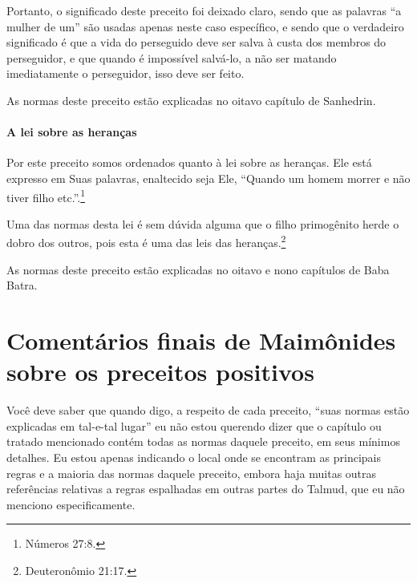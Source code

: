 Portanto, o significado deste preceito foi deixado claro, sendo que as
palavras ``a mulher de um'' são usadas apenas neste caso específico, e
sendo que o verdadeiro significado é que a vida do perseguido deve ser
salva à custa dos membros do perseguidor, e que quando é impossível salvá-lo, a não
ser matando imediatamente o perseguidor, isso deve ser feito.

As normas deste preceito estão explicadas no oitavo capítulo de Sanhedrin.

\paragraph{A lei sobre as heranças}

Por este preceito somos ordenados quanto à lei sobre as heranças. Ele
está expresso em Suas palavras, enaltecido seja Ele, ``Quando um homem
morrer e não tiver filho etc.''.\footnote{Números 27:8.}

Uma das normas desta lei é sem dúvida alguma que o filho primogênito
herde o dobro dos outros, pois esta é uma das leis das
heranças.\footnote{Deuteronômio 21:17.}

As normas deste preceito estão explicadas no oitavo e nono capítulos de
Baba Batra.

\section{Comentários finais de Maimônides sobre os preceitos positivos}

Você deve saber que quando digo, a respeito de cada preceito, ``suas
normas estão explicadas em tal-e-tal lugar'' eu não estou querendo dizer
que o capítulo ou tratado mencionado contém todas as normas daquele
preceito, em seus mínimos detalhes. Eu estou apenas indicando o local
onde se encontram as principais regras e a maioria das normas daquele
preceito, embora haja muitas outras referências relativas a regras
espalhadas em outras partes do Talmud, que eu não menciono
especificamente.

